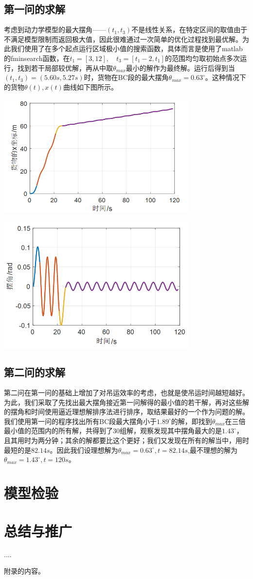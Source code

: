 \documentclass[withoutpreface,bwprint]{cumcmthesis} %
\begin{document}
\subsection{第一问的求解}
考虑到动力学模型的最大摆角——$(t_1,t_3)$不是线性关系，在特定区间的取值由于不满足模型限制而返回极大值，因此很难通过一次简单的优化过程找到最优解。为此我们使用了在多个起点运行区域极小值的搜索函数，具体而言是使用了matlab的fminsearch函数，在$t_1=[3,12],\quad t_3=[t_1-2,t_1]$的范围均匀取初始点多次运行，找到若干局部较优解，再从中取$\theta_{max}$最小的解作为最终解。运行后得到当$(t_1,t_3)=(5.60s,5.27s)$时，货物在BC段的最大摆角$\theta_{max}=0.63^{\circ}$。这种情况下的货物$\theta(t),x(t)$曲线如下图所示。
\centerline{\includegraphics[width=10cm]{p1x.png}}
\centerline{\includegraphics[width=10cm]{p1theta.png}}

\subsection{第二问的求解}
第二问在第一问的基础上增加了对吊运效率的考虑，也就是使吊运时间越短越好。为此，我们采取了先找出最大摆角接近第一问解得的最小值的若干解，再对这些解的摆角和时间使用逼近理想解排序法进行排序，取结果最好的一个作为问题的解。我们使用第一问的程序找出所有BC段最大摆角小于$1.89^{\circ}$的解，即找到$\theta_{max}$在三倍最小值的范围内的所有解，共得到了30组解，观察发现其中摆角最大的是$1.43^{\circ}$，且其用时为两分钟；其余的解都要比这个更好；我们又发现在所有的解当中，用时最短的是$82.14s$。因此我们设理想解为$\theta_{max}=0.63^{\circ},t=82.14s$,最不理想的解为$\theta_{max}=1.43^{\circ},t=120s$。

\section{模型检验}
\section{总结与推广}
\begin{thebibliography}{9}%
     ....
\end{thebibliography}
\begin{appendices}
    附录的内容。
\end{appendices}
\end{document}
